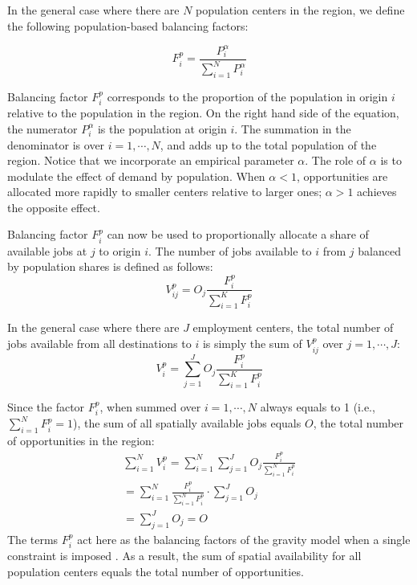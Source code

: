 \documentclass[]{elsarticle} %
\begin{document}
In the general case where there are \(N\) population centers in the
region, we define the following population-based balancing factors:

\begin{equation}
\label{eq:population-balancing-factor}
F^p_{i} = \frac{P_{i}^\alpha}{\sum_{i=1}^N P_{i}^\alpha}
\end{equation}

Balancing factor \(F^p_{i}\) corresponds to the proportion of the
population in origin \(i\) relative to the population in the region. On
the right hand side of the equation, the numerator \(P_{i}^\alpha\) is
the population at origin \(i\). The summation in the denominator is over
\(i=1,\cdots,N\), and adds up to the total population of the region.
Notice that we incorporate an empirical parameter \(\alpha\). The role
of \(\alpha\) is to modulate the effect of demand by population. When
\(\alpha <1\), opportunities are allocated more rapidly to smaller
centers relative to larger ones; \(\alpha>1\) achieves the opposite
effect.

Balancing factor \(F^p_{i}\) can now be used to proportionally allocate
a share of available jobs at \(j\) to origin \(i\). The number of jobs
available to \(i\) from \(j\) balanced by population shares is defined
as follows: \[
V^p_{ij} = O_j\frac{F^p_{i}}{\sum_{i=1}^K F^p_{i}}
\]

In the general case where there are \(J\) employment centers, the total
number of jobs available from all destinations to \(i\) is simply the
sum of \(V^p_{ij}\) over \(j=1,\cdots, J\): \[
V^p_{i} = \sum_{j=1}^J O_j\frac{F^p_{i}}{\sum_{i=1}^K F^p_{i}}
\]

Since the factor \(F^p_{i}\), when summed over \(i=1,\cdots,N\) always
equals to 1 (i.e., \(\sum_{i=1}^{N} F^p_{i} = 1\)), the sum of all
spatially available jobs equals \(O\), the total number of opportunities
in the region: \[
\begin{array}{l}
\sum_{i=1}^N V^p_i =\sum_{i=1}^N\sum_{j=1}^JO_j\frac{F^p_{i}}{\sum_{i=1}^N F^p_{i}}\\
=\sum_{i=1}^N \frac{F^p_{i}}{\sum_{i=1}^N F^p_{i}}\cdot\sum_{j=1}^JO_j\\
=\sum_{j=1}^J O_j = O
\end{array}
\] The terms \(F^p_{i}\) act here as the balancing factors of the
gravity model when a single constraint is imposed \citep[i.e., to ensure
that the sums of columns are equal to the number of opportunities per
destination, see][pp.~179-180 and 183-184]{ortuzar_2011_modelling}. As a
result, the sum of spatial availability for all population centers
equals the total number of opportunities.
\end{document}
